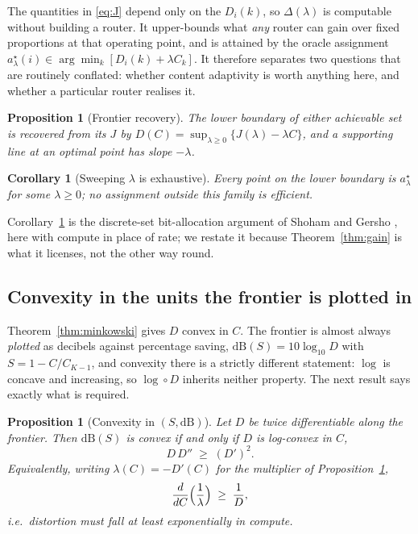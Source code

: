 \documentclass[10pt]{article}
\theoremstyle{plain}
\newtheorem{proposition}[theorem]{Proposition}
\newtheorem{corollary}[theorem]{Corollary}
\theoremstyle{definition}
\begin{document}
The quantities in \eqref{eq:J} depend only on the $D_i(k)$, so $\Delta(\lambda)$ is computable without building a router. It upper-bounds what
\emph{any} router can gain over fixed proportions at that operating point, and
is attained by the oracle assignment $a^\star_\lambda(i)\in\arg\min_k[D_i(k)+\lambda C_k]$.
It therefore separates two questions that are routinely conflated: whether
content adaptivity is worth anything here, and whether a particular router
realises it.

\begin{proposition}[Frontier recovery]\label{prop:legendre}
The lower boundary of either achievable set is recovered from its $J$ by
$D(C)=\sup_{\lambda\ge0}\{J(\lambda)-\lambda C\}$, and a supporting line at an
optimal point has slope $-\lambda$.
\end{proposition}

\begin{corollary}[Sweeping $\lambda$ is exhaustive]\label{cor:sweep}
Every point on the lower boundary is $a^\star_\lambda$ for some $\lambda\ge0$;
no assignment outside this family is efficient.
\end{corollary}

Corollary~\ref{cor:sweep} is the discrete-set bit-allocation argument of Shoham
and Gersho \cite{shoham1988}, here with compute in place of rate; we restate it
because Theorem~\ref{thm:gain} is what it licenses, not the other way round.

\subsection{Convexity in the units the frontier is plotted in}

Theorem~\ref{thm:minkowski} gives $D$ convex in $C$. The frontier is almost
always \emph{plotted} as decibels against percentage saving,
$\mathrm{dB}(S)=10\log_{10}D$ with $S=1-C/C_{K-1}$, and convexity there is a
strictly different statement: $\log$ is concave and increasing, so $\log\circ D$
inherits neither property. The next result says exactly what is required.

\begin{proposition}[Convexity in $(S,\mathrm{dB})$]\label{prop:logconvex}
Let $D$ be twice differentiable along the frontier. Then $\mathrm{dB}(S)$ is
convex if and only if $D$ is \emph{log-convex} in $C$,
\begin{equation}\label{eq:logconvex}
D\,D''\;\ge\;(D')^2 .
\end{equation}
Equivalently, writing $\lambda(C)=-D'(C)$ for the multiplier of
Proposition~\ref{prop:legendre},
\begin{equation}\label{eq:lambda-form}
\frac{d}{dC}\Bigl(\frac{1}{\lambda}\Bigr)\;\ge\;\frac{1}{D},
\end{equation}
i.e.\ distortion must fall at least exponentially in compute.
\end{proposition}
\end{document}

